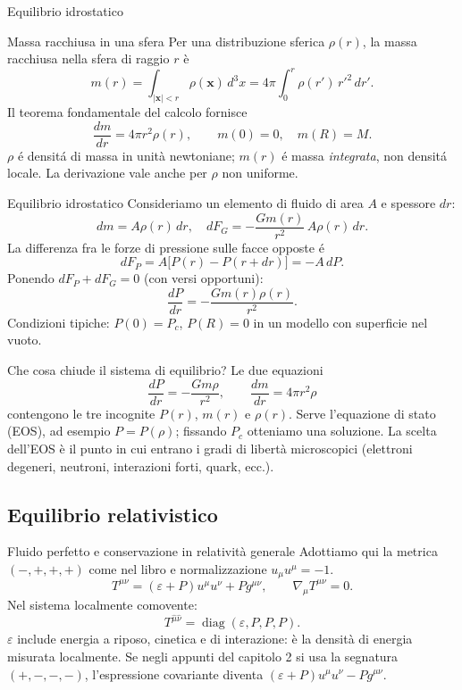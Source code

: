 \begin{frame}[t]{Equilibrio idrostatico}
\begin{block}{Massa racchiusa in una sfera}
\small
Per una distribuzione sferica $\rho(r)$, la massa racchiusa nella sfera di raggio $r$ è
\[
m(r)=\int_{|\mathbf x|<r}\rho(\mathbf x)\,d^3x
=4\pi\int_0^r\rho(r')\,r'^2\,dr'.
\]
Il teorema fondamentale del calcolo fornisce
\[
\frac{dm}{dr}=4\pi r^2\rho(r),\qquad m(0)=0,\quad m(R)=M.
\]
$\rho$ \'e densit\'a di massa in unità newtoniane; $m(r)$ \'e massa \emph{integrata}, non densit\'a locale. La derivazione vale anche per $\rho$ non uniforme.
\end{block}
\begin{block}{Equilibrio idrostatico}
\small
Consideriamo un elemento di fluido di area $A$ e spessore $dr$:
\[
dm=A\rho(r)\,dr,\quad dF_G=-\frac{Gm(r)}{r^2}\,A\rho(r)\,dr.
\]
La differenza fra le forze di pressione sulle facce opposte \'e
\[
dF_P=A\bigl[P(r)-P(r+dr)\bigr]=-A\,dP.
\]
Ponendo $dF_P+dF_G=0$ (con versi opportuni):
\[
\frac{dP}{dr}=-\frac{Gm(r)\rho(r)}{r^2}.
\]
Condizioni tipiche: $P(0)=P_c$, $P(R)=0$ in un modello con superficie nel vuoto.
\end{block}
\begin{block}{Che cosa chiude il sistema di equilibrio?}
\small
Le due equazioni
\[
\frac{dP}{dr}=-\frac{Gm\rho}{r^2},\qquad
\frac{dm}{dr}=4\pi r^2\rho
\]
contengono le tre incognite $P(r)$, $m(r)$ e $\rho(r)$.
\medskip
Serve l'equazione di stato (EOS), ad esempio $P=P(\rho)$; fissando $P_c$ otteniamo una soluzione.
\medskip
La scelta dell'EOS è il punto in cui entrano i gradi di libertà microscopici (elettroni degeneri, neutroni, interazioni forti, quark, ecc.).
\end{block}
\end{frame}

\subsection{Equilibrio relativistico}

\begin{frame}[t]{Fluido perfetto e conservazione in relatività generale}
\small
Adottiamo qui la metrica $(-,+,+,+)$ come nel libro e normalizzazione $u_\mu u^\mu=-1$.
\[
T^{\mu\nu}=(\varepsilon+P)u^\mu u^\nu+Pg^{\mu\nu},
\qquad \nabla_\mu T^{\mu\nu}=0.
\]
Nel sistema localmente comovente:
\[
T^{\hat\mu\hat\nu}=\operatorname{diag}(\varepsilon,P,P,P).
\]
$\varepsilon$ include energia a riposo, cinetica e di interazione: è la densità di energia misurata localmente. Se negli appunti del capitolo 2 si usa la segnatura $(+,-,-,-)$, l'espressione covariante diventa $(\varepsilon+P)u^\mu u^\nu-Pg^{\mu\nu}$.
\end{frame}

